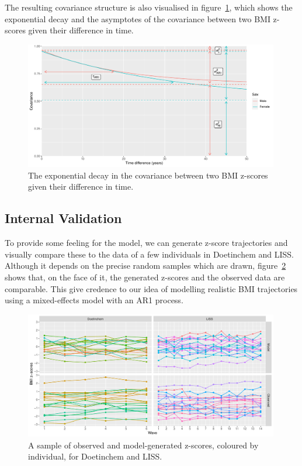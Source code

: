 \documentclass{imammb}
\numberwithin{equation}{section}
\begin{document}
The resulting covariance structure is also visualised in figure~\ref{fig:Covariance By Time Difference}, which shows the exponential decay and the asymptotes of the covariance between two BMI z-scores given their difference in time.

\begin{figure}[!h]
\centering
\includegraphics[width=0.99\textwidth] {"Figures/Covariance By Time Difference.pdf"}
\caption{The exponential decay in the covariance between two BMI z-scores given their difference in time.}
\label{fig:Covariance By Time Difference}
\vspace*{-9pt}
\end{figure}

\subsection{Internal Validation}
\label{sec:Individual Trajectories/Internal Validation}

To provide some feeling for the model, we can generate z-score trajectories and visually compare these to the data of a few individuals in Doetinchem and LISS. Although it depends on the precise random samples which are drawn, figure~\ref{fig:Individual Z-Score Trajectories} shows that, on the face of it, the generated z-scores and the observed data are comparable. This give credence to our idea of modelling realistic BMI trajectories using a mixed-effects model with an AR1 process.

\begin{figure}[!h]
\centering\includegraphics[width=0.99\textwidth] {"Figures/Individual Z-Score Trajectories.pdf"}
\caption{A sample of observed and model-generated z-scores, coloured by individual, for Doetinchem and LISS.}
\label{fig:Individual Z-Score Trajectories}
\vspace*{-9pt}
\end{figure}
\end{document}
